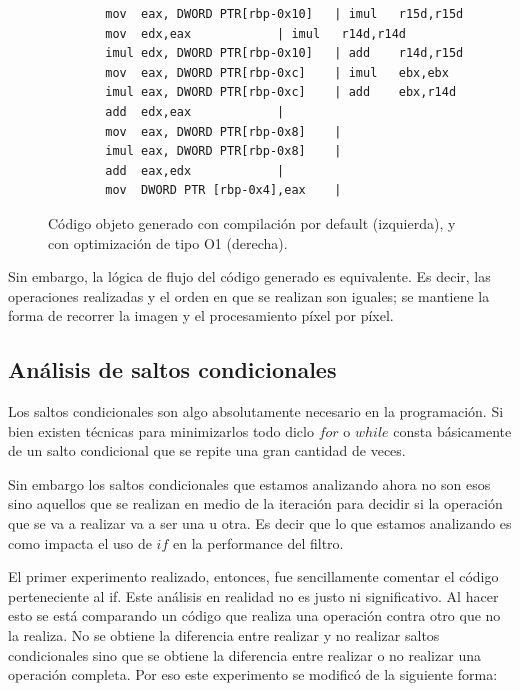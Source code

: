 \begin{figure}[h]
	\begin{mdframed}
	\begin{center}
		\begin{lstlisting}
		mov  eax, DWORD PTR[rbp-0x10]	| imul   r15d,r15d
		mov  edx,eax			| imul   r14d,r14d
		imul edx, DWORD PTR[rbp-0x10]	| add    r14d,r15d
		mov  eax, DWORD PTR[rbp-0xc]	| imul   ebx,ebx
		imul eax, DWORD PTR[rbp-0xc]	| add    ebx,r14d
		add  edx,eax			|			
		mov  eax, DWORD PTR[rbp-0x8]	|			
		imul eax, DWORD PTR[rbp-0x8]	|			
		add  eax,edx			|			
		mov  DWORD PTR [rbp-0x4],eax	|			
		\end{lstlisting}
	\end{center}
	\end{mdframed}
	\caption{Código objeto generado con compilación por default (izquierda), y con optimización de tipo O1 (derecha).}
	\label{fig:codigo-objeto-filtro-color}
\end{figure}

Sin embargo, la lógica de flujo del código generado es equivalente. Es decir, las operaciones realizadas y el orden en que se realizan son iguales; se mantiene la forma de recorrer la imagen y el procesamiento píxel por píxel.


\subsection{Análisis de saltos condicionales}

	Los saltos condicionales son algo absolutamente necesario en la programación.
Si bien existen técnicas para minimizarlos todo diclo $for$ o $while$ consta
básicamente de un salto condicional que se repite una gran cantidad de veces.

	Sin embargo los saltos condicionales que estamos analizando ahora no son
esos sino aquellos que se realizan en medio de la iteración para decidir
si la operación que se va a realizar va a ser una u otra. Es decir que lo
que estamos analizando es como impacta el uso de $if$ en la performance
del filtro.

	
	El primer experimento realizado, entonces, fue sencillamente comentar
el código perteneciente al if. Este análisis en realidad no es justo
ni significativo. Al hacer esto se está comparando un código
que realiza una operación contra otro que no la realiza.
No se obtiene la diferencia entre realizar y no realizar saltos
condicionales sino que se obtiene la diferencia entre realizar
o no realizar una operación completa. Por eso este experimento
se modificó de la siguiente forma:

